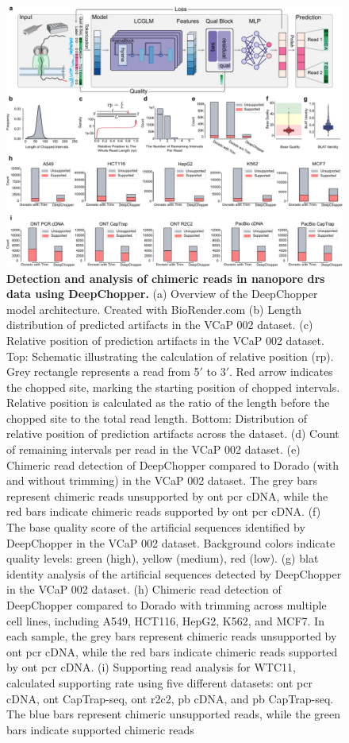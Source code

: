 \documentclass[pdflatex,sn-nature, lineno]{sn-jnl}%
\theoremstyle{thmstyleone}%
\theoremstyle{thmstyletwo}%
\theoremstyle{thmstylethree}%
\begin{document}
\begin{figure}[!h]
	\includegraphics[height=0.78\columnwidth]{finals/figure1}
	\caption{{\bf  Detection and analysis of chimeric reads in nanopore \gls{drs} data using DeepChopper.} (a) Overview of the DeepChopper model architecture. Created with BioRender.com (b) Length distribution of predicted artifacts in the VCaP 002 dataset. (c) Relative position of prediction artifacts in the VCaP 002 dataset. Top: Schematic illustrating the calculation of relative position (rp). Grey rectangle represents a read from 5$'$ to 3$'$. Red arrow indicates the chopped site, marking the starting position of chopped intervals. Relative position is calculated as the ratio of the length before the chopped site to the total read length. Bottom: Distribution of relative position of prediction artifacts across the dataset. (d) Count of remaining intervals per read in the VCaP 002 dataset. (e) Chimeric read detection of DeepChopper compared to Dorado (with and without trimming) in the VCaP 002 dataset. The grey bars represent chimeric reads unsupported by \gls{ont} \gls{pcr} cDNA, while the red bars indicate chimeric reads supported by \gls{ont} \gls{pcr} cDNA.  (f) The base quality score of the artificial sequences identified by DeepChopper in the VCaP 002 dataset. Background colors indicate quality levels: green (high), yellow (medium), red (low). (g) \gls{blat} identity analysis of the artificial sequences detected by DeepChopper in the VCaP 002 dataset. (h) Chimeric read detection of DeepChopper compared to Dorado with trimming across multiple cell lines, including A549, HCT116, HepG2, K562, and MCF7. In each sample, the grey bars represent chimeric reads unsupported by \gls{ont} \gls{pcr} cDNA, while the red bars indicate chimeric reads supported by \gls{ont} \gls{pcr} cDNA. (i)  Supporting read analysis for WTC11, calculated supporting rate using five different datasets: \gls{ont} \gls{pcr} cDNA, \gls{ont} CapTrap-seq, \gls{ont} \gls{r2c2}, \gls{pb} cDNA, and \gls{pb} CapTrap-seq. The blue bars represent chimeric unsupported reads, while the green bars indicate supported chimeric reads}\label{fig:f1}
\end{figure}
\end{document}
